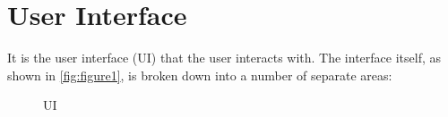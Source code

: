 
\section{User Interface}

It is the user interface (UI) that the user interacts with. The interface itself, as
shown in \autoref{fig:figure1}, is broken down into a number of separate areas:


\begin{figure}[!htbp]
  \caption{UI}
  \label{fig:figure1}
\end{figure}


